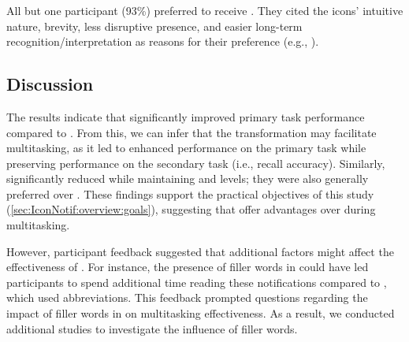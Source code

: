 \subsubsection*{\Satisfaction{}}
\label{sec:IconNotif:study1:satisfaction_parameter}

All but one participant (93\%) preferred to receive . They cited the icons' intuitive nature, brevity, less disruptive presence, and easier long-term recognition/interpretation as reasons for their preference (e.g., ). 


\subsection{Discussion}
\label{sec:IconNotif:study1:discussion}

The results indicate that  significantly improved primary task performance compared to . From this, we can infer that the transformation may facilitate multitasking, as it led to enhanced performance on the primary task while preserving performance on the secondary task (i.e., recall accuracy). Similarly,  significantly reduced \Interruption{} while maintaining \Reaction{} and \Comprehension{} levels; they were also generally preferred over . These findings support the practical objectives of this study (\autoref{sec:IconNotif:overview:goals}), suggesting that  offer advantages over  during multitasking.

However, participant feedback suggested that additional factors might affect the effectiveness of . For instance, the presence of filler words in  could have led participants to spend additional time reading these notifications compared to , which used abbreviations. This feedback prompted questions regarding the impact of filler words in  on multitasking effectiveness. As a result, we conducted additional studies to investigate the influence of filler words.

















